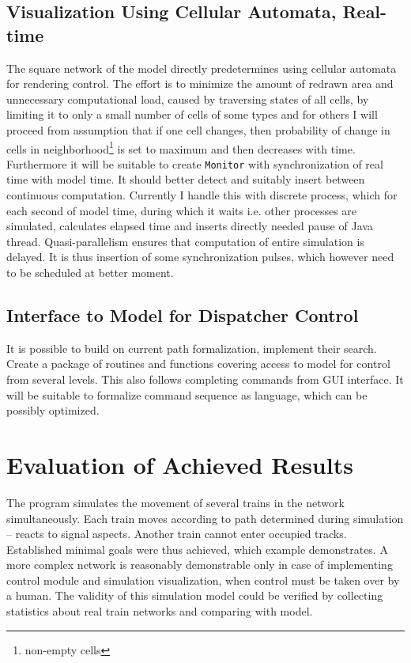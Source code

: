 \documentclass[english]{cls/fitthesis}
\newcommand{\cfr}[1]{\texttt{#1}}
\newcommand{\sourceRef}[1]{\cfr{#1}}
\begin{document}
 \subsection*{Visualization Using Cellular Automata, Real-time}
   The square network of the model directly predetermines using cellular automata for rendering control.
   The effort is to minimize the amount of redrawn area and unnecessary computational load,
   caused by traversing states of all cells, by limiting it to only a small number of cells of some types
   and for others I will proceed from assumption that if one cell changes, then probability
   of change in cells in neighborhood\footnote{non-empty cells} is set to maximum and then decreases with time.
   Furthermore it will be suitable to create \sourceRef{Monitor} with synchronization of real time with model time. It should
   better detect and suitably insert  between continuous computation. Currently I handle this with discrete
   process, which for each second of model time, during which it waits i.e. other processes are simulated,
   calculates elapsed time and inserts directly needed pause of Java thread.
   Quasi-parallelism ensures that computation of entire simulation is delayed. It is thus insertion of some
   synchronization pulses, which however need to be scheduled at better moment.
 \subsection*{Interface to Model for Dispatcher Control}
   It is possible to build on current path formalization, implement their search.
   Create a package of routines and functions covering access to model for control from several levels.
   This also follows completing commands from GUI interface.
   It will be suitable to formalize command sequence as language, which can be possibly optimized.

\section{Evaluation of Achieved Results}
The program simulates the movement of several trains in the network simultaneously.
Each train moves according to path determined during simulation -- reacts to signal aspects.
Another train cannot enter occupied tracks.
Established minimal goals were thus achieved, which example demonstrates. A more complex network is reasonably demonstrable only in case of implementing control module and simulation visualization, when control must be taken over by a human.
The validity of this simulation model could be verified by collecting statistics about real train networks and comparing
with model.
\end{document}
